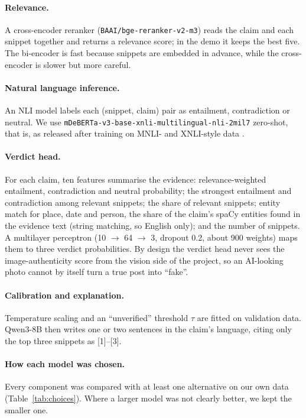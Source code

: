 \documentclass[11pt,a4paper]{article}
\begin{document}
\paragraph{Relevance.} A cross-encoder reranker (\texttt{BAAI/bge-reranker-v2-m3}) reads the claim and each snippet together and returns a relevance score; in the demo it keeps the best five. The bi-encoder is fast because snippets are embedded in advance, while the cross-encoder is slower but more careful.

\paragraph{Natural language inference.} An NLI model labels each (snippet, claim) pair as entailment, contradiction or neutral. We use \texttt{mDeBERTa-v3-base-xnli-multilingual-nli-2mil7} \citep{laurer2022mdeberta,he2023debertav3} zero-shot, that is, as released after training on MNLI- and XNLI-style data \citep{conneau2018xnli}.

\paragraph{Verdict head.} For each claim, ten features summarise the evidence: relevance-weighted entailment, contradiction and neutral probability; the strongest entailment and contradiction among relevant snippets; the share of relevant snippets; entity match for place, date and person, the share of the claim's spaCy entities \citep{honnibal2020spacy} found in the evidence text (string matching, so English only); and the number of snippets. A multilayer perceptron (10 $\rightarrow$ 64 $\rightarrow$ 3, dropout 0.2, about 900 weights) maps them to three verdict probabilities. By design the verdict head never sees the image-authenticity score from the vision side of the project, so an AI-looking photo cannot by itself turn a true post into ``fake''.

\paragraph{Calibration and explanation.} Temperature scaling \citep{guo2017calibration} and an ``unverified'' threshold $\tau$ are fitted on validation data. Qwen3-8B then writes one or two sentences in the claim's language, citing only the top three snippets as [1]--[3].

\paragraph{How each model was chosen.} Every component was compared with at least one alternative on our own data (Table~\ref{tab:choices}). Where a larger model was not clearly better, we kept the smaller one.
\end{document}
